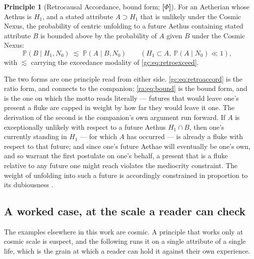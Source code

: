 \documentclass[11pt]{article}
\numberwithin{equation}{section}
\theoremstyle{plain}
\theoremstyle{definition}
\newtheorem{principle}{Principle}
\theoremstyle{remark}
\newcommand{\PP}{\mathbb{P}}
\begin{document}
\begin{principle}[Retrocausal Accordance, bound form; \textbf{[$\Phi$]}]
\label{ra:prin:bound}
For an Aetherian whose Aethus is $H_1$, and a stated attribute
$A\supset H_1$ that is unlikely under the Cosmic Nexus, the probability
of centric unfolding to a future Aethus containing stated attribute $B$
is bounded above by the probability of $A$ given $B$ under the Cosmic
Nexus:
\begin{equation}\label{ra:eq:bound}
\PP(B\mid H_1,N_0)\;\lesssim\;\PP(A\mid B,N_0)
\qquad(H_1\subset A,\ \PP(A\mid N_0)\ll1),
\end{equation}
with $\lesssim$ carrying the exceedance modality of
\eqref{gc:eq:retroexceed}.
\end{principle}

The two forms are one principle read from either side.
\eqref{gc:eq:retroaccord} is the ratio form, and connects to the
companion; \eqref{ra:eq:bound} is the bound form, and is the one on which
the motto reads literally --- futures that would leave one's present a
fluke are capped in weight by how far they would leave it one. The
derivation of the second is the companion's own argument run forward.
If $A$ is exceptionally unlikely with respect to a future Aethus
$H_1\cap B$, then one's currently standing in $H_1$ --- for which $A$
has occurred --- is already a fluke with respect to that future; and
since one's future Aethae will eventually be one's own, and so warrant
the first postulate on one's behalf, a present that is a fluke relative
to any future one might reach violates the mediocrity constraint. The
weight of unfolding into such a future is accordingly constrained in
proportion to its dubiousness \cite{Nexus}.

\subsection{A worked case, at the scale a reader can check}
\label{ra:sub:example}

The examples elsewhere in this work are cosmic. A principle that works
only at cosmic scale is suspect, and the following runs it on a single
attribute of a single life, which is the grain at which a reader can hold
it against their own experience.
\end{document}
